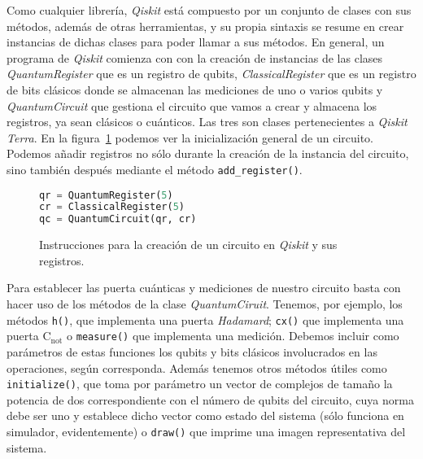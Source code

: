 Como cualquier librería, \textit{Qiskit} está compuesto por un conjunto de clases con sus métodos, además de otras herramientas, y su propia sintaxis se resume en crear instancias de dichas clases para poder llamar a sus métodos. En general, un programa de \textit{Qiskit} comienza con con la creación de instancias de las clases \textit{QuantumRegister} que es un registro de qubits, \textit{ClassicalRegister} que es un registro de bits clásicos donde se almacenan las mediciones de uno o varios qubits y \textit{QuantumCircuit} que gestiona el circuito que vamos a crear y almacena los registros, ya sean clásicos o cuánticos. Las tres son clases pertenecientes a \textit{Qiskit Terra}. En la figura~\ref{fig:code51} podemos ver la inicialización general de un circuito. Podemos añadir registros no sólo durante la creación de la instancia del circuito, sino también después mediante el método \texttt{add\_register()}.

\begin{figure}[b]
\begin{lstlisting}[language=Python]
qr = QuantumRegister(5)
cr = ClassicalRegister(5)
qc = QuantumCircuit(qr, cr)
\end{lstlisting}
\caption{Instrucciones para la creación de un circuito en \textit{Qiskit} y sus registros.}
\label{fig:code51}
\end{figure}

Para establecer las puerta cuánticas y mediciones de nuestro circuito basta con hacer uso de los métodos de la clase \textit{QuantumCiruit}. Tenemos, por ejemplo, los métodos \texttt{h()}, que implementa una puerta \textit{Hadamard}; \texttt{cx()} que implementa una puerta C$_\mathrm{not}$ o \texttt{measure()} que implementa una medición. Debemos incluir como parámetros de estas funciones los qubits y bits clásicos involucrados en las operaciones, según corresponda. Además tenemos otros métodos útiles como \texttt{initialize()}, que toma por parámetro un vector de complejos de tamaño la potencia de dos correspondiente con el número de qubits del circuito, cuya norma debe ser uno y establece dicho vector como estado del sistema (sólo funciona en simulador, evidentemente) o \texttt{draw()} que imprime una imagen representativa del sistema.

